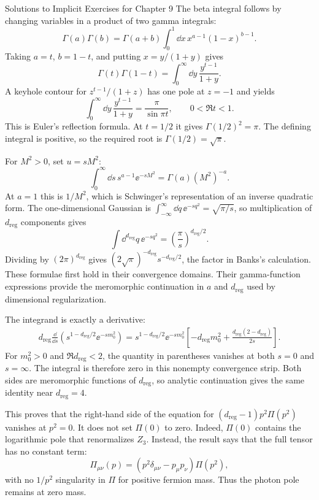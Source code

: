\begin{bankssolutions}{Solutions to Implicit Exercises for Chapter 9}
The beta integral follows by changing variables in a product of two gamma
integrals:
\[
  \Gamma(a)\Gamma(b)=\Gamma(a+b)
  \int_0^1\dd x\,x^{a-1}(1-x)^{b-1}.
\]
Taking $a=t$, $b=1-t$, and putting $x=y/(1+y)$ gives
\[
  \Gamma(t)\Gamma(1-t)
  =\int_0^\infty\dd y\,\frac{y^{t-1}}{1+y}.
\]
A keyhole contour for $z^{t-1}/(1+z)$ has one pole at $z=-1$ and yields
\[
  \int_0^\infty\dd y\,\frac{y^{t-1}}{1+y}
  =\frac{\pi}{\sin\pi t},
  \qquad 0<\Re t<1.
\]
This is Euler's reflection formula.  At $t=1/2$ it gives
$\Gamma(1/2)^2=\pi$.  The defining integral is positive, so the required root
is $\Gamma(1/2)=\sqrt\pi$.

For $M^2>0$, set $u=sM^2$:
\[
  \int_0^\infty\dd s\,s^{a-1}\ee^{-sM^2}
  =\Gamma(a)(M^2)^{-a}.
\]
At $a=1$ this is $1/M^2$, which is Schwinger's representation of an inverse
quadratic form.  The one-dimensional Gaussian is
$\int_{-\infty}^\infty\dd q\,\ee^{-sq^2}=\sqrt{\pi/s}$, so multiplication of
$d_{\mathrm{reg}}$ components gives
\[
  \int\dd^{d_{\mathrm{reg}}}q\,\ee^{-sq^2}
  =\left(\frac\pi s\right)^{d_{\mathrm{reg}}/2}.
\]
Dividing by $(2\pi)^{d_{\mathrm{reg}}}$ gives
$(2\sqrt\pi)^{-d_{\mathrm{reg}}}s^{-d_{\mathrm{reg}}/2}$, the factor in Banks's calculation.  These
formulae first hold in their convergence domains.  Their gamma-function
expressions provide the meromorphic continuation in $a$ and $d_{\mathrm{reg}}$ used by
dimensional regularization.

The integrand is exactly a derivative:
\begin{align*}
  d_{\mathrm{reg}}\frac{\dd}{\dd s}
  \left(s^{1-d_{\mathrm{reg}}/2}\ee^{-sm_0^2}\right)
  =s^{1-d_{\mathrm{reg}}/2}\ee^{-sm_0^2}
  \left[-d_{\mathrm{reg}}m_0^2
  +\frac{d_{\mathrm{reg}}(2-d_{\mathrm{reg}})}{2s}\right].
\end{align*}
For $m_0^2>0$ and $\Re d_{\mathrm{reg}}<2$, the quantity in parentheses vanishes at both
$s=0$ and $s=\infty$.  The integral is therefore zero in this nonempty
convergence strip.  Both sides are meromorphic functions of $d_{\mathrm{reg}}$, so analytic
continuation gives the same identity near $d_{\mathrm{reg}}=4$.

This proves that the right-hand side of the equation for
$(d_{\mathrm{reg}}-1)p^2\Pi(p^2)$ vanishes at $p^2=0$.  It does not set $\Pi(0)$ to zero.
Indeed, $\Pi(0)$ contains the logarithmic pole that renormalizes $Z_3$.
Instead, the result says that the full tensor has no constant term:
\[
  \Pi_{\mu\nu}(p)=
  (p^2\delta_{\mu\nu}-p_\mu p_\nu)\Pi(p^2),
\]
with no $1/p^2$ singularity in $\Pi$ for positive fermion mass.  Thus the
photon pole remains at zero mass.


\end{bankssolutions}
